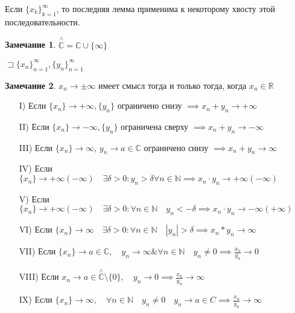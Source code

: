 \documentclass{book}
\newcommand\N{\ensuremath{\mathbb{N}}}
\newcommand\R{\ensuremath{\mathbb{R}}}
\renewcommand\C{\ensuremath{\mathbb{C}}}
\theoremstyle{definition}
\newtheorem*{note}{Замечание}
\begin{document}
    Если $\{x_k\}_{k=1}^{\infty }$, то последняя лемма применима к некоторому хвосту этой последовательности. 
\begin{note}
    $\overset{\land}{\C} = \C\cup \{\infty \}$
\end{note}
    \begin{theorem}

        $\sqsupset \{x_{n} \}_{n=1}^{\infty }, \{y_{n} \}_{n=1}^{\infty }$

        \begin{note}
            $x_{n} \to \pm \infty $ имеет смысл тогда и только тогда, когда $x_{n} \in \R$
        \end{note}

        \begin{itemize}
            \item [I)] Если $\{x_{n}\} \to +\infty , \{y_{n}\} $ ограничено снизу $\implies  x_{n} +y_{n} \to  +\infty $ 
            \item [II)] Если $\{x_{n} \} \to -\infty , \{y_{n} \}$ ограничена сверху $\implies  x_{n} +y_{n} \to -\infty $
            \item [III)] Если $\{x_{n} \} \to \infty$, $y_n\to a\in \C$ ограничено снизу $\implies x_{n} +y_{n} \to \infty $
            \item [IV)] Если $\{x_{n} \} \to  +\infty(-\infty ) \quad \exists \delta >0: y_{n} >\delta \forall n\in \N  \implies x_{n} \cdot y_{n} \to +\infty (-\infty )$
            \item [V)] Если $\{x_{n} \} \to +\infty (-\infty )\quad \exists \delta >0:\forall n\in \N \quad y_{n} <-\delta \implies x_{n} \cdot y_{n}  \to -\infty (+\infty )$
            \item [VI)] Если $\{x_{n} \} \to  \infty \quad \exists \delta >0: \forall n\in \N  \quad |y_{n}|>\delta \implies x_{n} *y_{n}  \to \infty $
            \item [VII)] Если $\{x_{n} \} \to a\in \C, \quad y_{n} \to \infty \& \forall n\in \N \quad y_{n} \neq 0 \implies \frac{x_{n} }{y_{n} }  \to  0$
            \item [VIII)] Если $x_{n} \to a\in \overset{\land}{\C}\setminus \{0\}, \quad y_{n} \to  0 \implies  \frac{x_{n} }{y_{n} }\to \infty $
            \item [IX)] Если $\{x_{n} \} \to  \infty , \quad \forall n\in \N \quad y_{n} \neq 0\quad y_{n} \to a\in C \implies \frac{x_{n} }{y_{n} } \to \infty $
        \end{itemize}
    \end{theorem}
\end{document}
